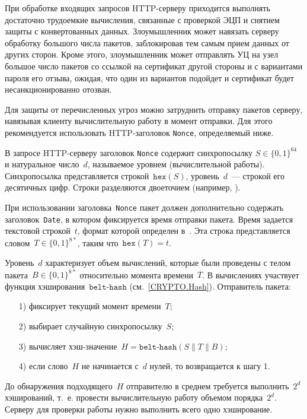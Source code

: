 При обработке входящих запросов HTTP-серверу приходится выполнять 
достаточно трудоемкие вычисления, связанные с проверкой ЭЦП и снятием 
защиты с конвертованных данных.
%
Злоумышленник может навязать серверу обработку большого числа пакетов, 
заблокировав тем самым прием данных от других сторон. 
%
Кроме этого, злоумышленник может отправлять УЦ на узел~
большое число пакетов со ссылкой на сертификат другой стороны и с вариантами 
пароля его отзыва, ожидая, что один из вариантов подойдет и сертификат 
будет несанкционированно отозван.

Для защиты от перечисленных угроз можно затруднить отправку пакетов 
серверу, навязывая клиенту вычислительную работу в момент отправки.
Для этого рекомендуется использовать HTTP-заголовок \texttt{Nonce}, 
определяемый ниже.

В запросе HTTP-серверу заголовок \texttt{Nonce} содержит синхропосылку 
$S\in\{0,1\}^{64}$ и натуральное число~$d$, называемое уровнем 
(вычислительной работы).
%
Синхропосылка представляется строкой~$\texttt{hex}(S)$, уровень~$d$~--- 
строкой его десятичных цифр. Строки разделяются двоеточием
(например, ).

При использовании заголовка~\texttt{Nonce} пакет должен дополнительно
содержать заголовок~\texttt{Date}, в котором фиксируется время отправки 
пакета. Время задается текстовой строкой~$t$, формат которой определен 
в~\cite{HTTP}. Эта строка представляется словом~$T\in\{0,1\}^{8*}$, 
таким что~$\texttt{hex}(T)=t$.

Уровень~$d$ характеризует объем вычислений, которые были проведены
с телом пакета~$B\in\{0,1\}^{8*}$ относительно момента времени~$T$.
%
В вычислениях участвует функция хэширования~$\texttt{belt-hash}$
(см.~\ref{CRYPTO.Hash}). Отправитель пакета:
\begin{enumerate}
\item[1)]
фиксирует текущий момент времени~$T$;
\item[2)]
выбирает случайную синхропосылку~$S$;
\item[3)]
вычисляет хэш-значение~$H=\texttt{belt-hash}(S\parallel T\parallel B)$;
\item[4)]
если слово~$H$ не начинается с~$d$ нулей, то возвращается к шагу 1.
\end{enumerate}

До обнаружения подходящего~$H$ отправителю в среднем требуется 
выполнить~$2^d$ хэширований, т.~е. провести вычислительную работу объемом  
порядка~$2^d$. Серверу для проверки работы нужно выполнить всего одно
хэширование.

